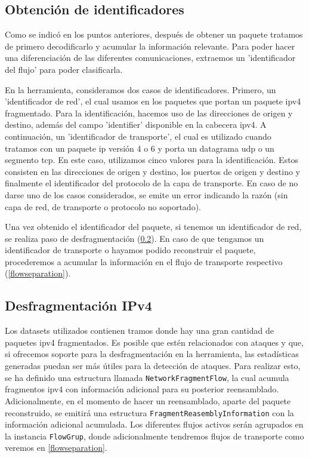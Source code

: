 \subsection{Obtención de identificadores} \label{idextraction}

Como se indicó en los puntos anteriores, después de obtener un paquete tratamos de primero decodificarlo y acumular la información relevante. Para poder hacer una diferenciación de las diferentes comunicaciones, extraemos un 'identificador del flujo' para poder clasificarla.

En la herramienta, consideramos dos casos de identificadores. Primero, un 'identificador de red', el cual usamos en los paquetes que portan un paquete \acrshort{ipv4} fragmentado. Para la identificación, hacemos uso de las direcciones de origen y destino, además del campo 'identifier' disponible en la cabecera \acrshort{ipv4}. A continuación, un 'identificador de transporte', el cual es utilizado cuando tratamos con un paquete \acrshort{ip} versión 4 o 6 y porta un datagrama \acrshort{udp} o un segmento \acrshort{tcp}. En este caso, utilizamos cinco valores para la identificación. Estos consisten en las direcciones de origen y destino, los puertos de origen y destino y finalmente el identificador del protocolo de la capa de transporte. En caso de no darse uno de los casos considerados, se emite un error indicando la razón (sin capa de red, de transporte o protocolo no soportado).

Una vez obtenido el identificador del paquete, si tenemos un identificador de red, se realiza paso de desfragmentación (\ref{ipv4defrag}). En caso de que tengamos un identificador de transporte o hayamos podido reconstruir el paquete, procederemos a acumular la información en el flujo de transporte respectivo (\ref{flowseparation}).

\subsection{Desfragmentación IPv4} \label{ipv4defrag}

Los datasets utilizados contienen tramos donde hay una gran cantidad de paquetes \acrshort{ipv4} fragmentados. Es posible que estén relacionados con ataques y que, si ofrecemos soporte para la desfragmentación en la herramienta, las estadísticas generadas puedan ser más útiles para la detección de ataques. Para realizar esto, se ha definido una estructura llamada \texttt{NetworkFragmentFlow}, la cual acumula fragmentos \acrshort{ipv4} con información adicional para su posterior reensamblado. Adicionalmente, en el momento de hacer un reensamblado, aparte del paquete reconstruido, se emitirá una estructura \texttt{FragmentReasemblyInformation} con la información adicional acumulada. Los diferentes flujos activos serán agrupados en la instancia \texttt{FlowGrup}, donde adicionalmente tendremos flujos de transporte como veremos en \ref{flowseparation}.

